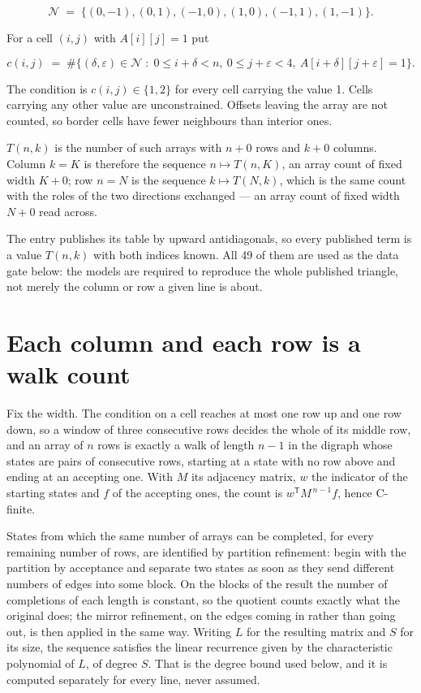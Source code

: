 \documentclass[11pt]{article}
\theoremstyle{definition}
\begin{document}
\[\mathcal{N} \;=\; \{(0,-1), (0,1), (-1,0), (1,0), (-1,1), (1,-1)\}.\]

For a cell $(i,j)$ with $A[i][j] = 1$ put

\[c(i,j) \;=\; \#\bigl\{(\delta,\varepsilon)\in\mathcal{N} \;:\; 0\le i+\delta<n,\ 0\le j+\varepsilon<4,\ A[i+\delta][j+\varepsilon] = 1\bigr\}.\]

The condition is $c(i,j) \in \{1, 2\}$ for every cell carrying the value 1. Cells carrying any other value are unconstrained. Offsets leaving the array are not counted, so border cells have fewer neighbours than interior ones.

$T(n,k)$ is the number of such arrays with $n + 0$ rows and $k + 0$ columns. Column $k = K$ is therefore the sequence $n \mapsto T(n,K)$, an array count of fixed width $K + 0$; row $n = N$ is the sequence $k \mapsto T(N,k)$, which is the same count with the roles of the two directions exchanged --- an array count of fixed width $N + 0$ read across.

The entry publishes its table by upward antidiagonals, so every published term is a value $T(n,k)$ with both indices known. All 49 of them are used as the data gate below: the models are required to reproduce the whole published triangle, not merely the column or row a given line is about.

\section{Each column and each row is a walk count}

Fix the width. The condition on a cell reaches at most one row up and one row down, so a window of three consecutive rows decides the whole of its middle row, and an array of $n$ rows is exactly a walk of length $n-1$ in the digraph whose states are pairs of consecutive rows, starting at a state with no row above and ending at an accepting one. With $M$ its adjacency matrix, $w$ the indicator of the starting states and $f$ of the accepting ones, the count is $w^{\mathsf T}M^{\,n-1}f$, hence C-finite.

States from which the same number of arrays can be completed, for every remaining number of rows, are identified by partition refinement: begin with the partition by acceptance and separate two states as soon as they send different numbers of edges into some block. On the blocks of the result the number of completions of each length is constant, so the quotient counts exactly what the original does; the mirror refinement, on the edges coming in rather than going out, is then applied in the same way. Writing $L$ for the resulting matrix and $S$ for its size, the sequence satisfies the linear recurrence given by the characteristic polynomial of $L$, of degree $S$. That is the degree bound used below, and it is computed separately for every line, never assumed.
\end{document}
